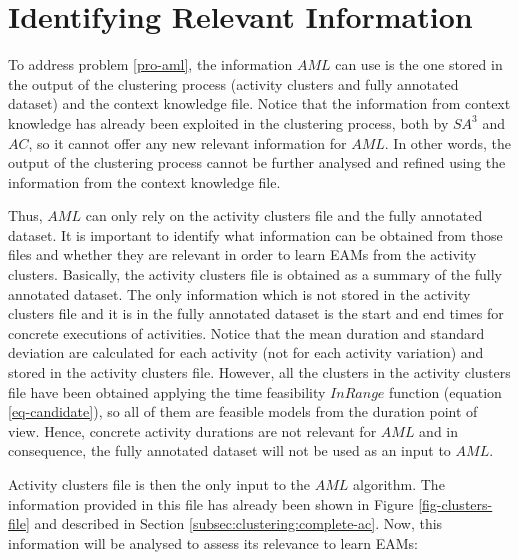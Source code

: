 \section{Identifying Relevant Information}
\label{sec:learner:relevant}


To address problem \ref{pro-aml}, the information $AML$ can use is the one stored in the output of the clustering process (activity clusters and fully annotated dataset) and the context knowledge file. Notice that the information from context knowledge has already been exploited in the clustering process, both by $SA^3$ and $AC$, so it cannot offer any new relevant information for $AML$. In other words, the output of the clustering process cannot be further analysed and refined using the information from the context knowledge file.

Thus, $AML$ can only rely on the activity clusters file and the fully annotated dataset. It is important to identify what information can be obtained from those files and whether they are relevant in order to learn EAMs from the activity clusters. Basically, the activity clusters file is obtained as a summary of the fully annotated dataset. The only information which is not stored in the activity clusters file and it is in the fully annotated dataset is the start and end times for concrete executions of activities. Notice that the mean duration and standard deviation are calculated for each activity (not for each activity variation) and stored in the activity clusters file. However, all the clusters in the activity clusters file have been obtained applying the time feasibility $InRange$ function (equation \ref{eq-candidate}), so all of them are feasible models from the duration point of view. Hence, concrete activity durations are not relevant for $AML$ and in consequence, the fully annotated dataset will not be used as an input to $AML$.

Activity clusters file is then the only input to the $AML$ algorithm. The information provided in this file has already been shown in Figure \ref{fig-clusters-file} and described in Section \ref{subsec:clustering:complete-ac}. Now, this information will be analysed to assess its relevance to learn EAMs:

